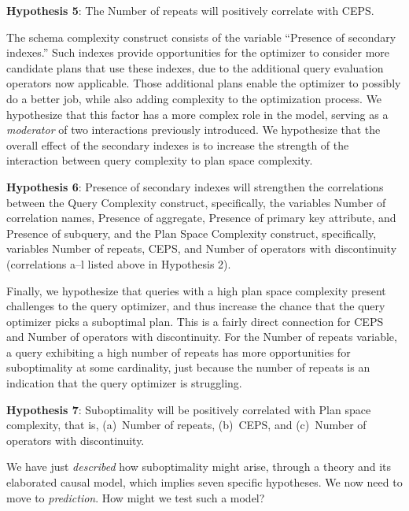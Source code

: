 \documentclass[prodmode,acmtods]{acmsmall}
\begin{document}
\vspace{0.6em}\noindent
{\bf Hypothesis 5}: The Number of repeats will positively correlate with CEPS. 

\vspace{0.6em}
The schema complexity construct consists of the variable ``Presence of
secondary indexes.'' Such indexes provide opportunities for the optimizer to
consider more candidate plans that use these indexes, due to the additional
query evaluation operators now applicable. Those additional plans enable the optimizer to
possibly do a better job, while also adding complexity to the optimization
process. We hypothesize that this factor has a more complex role in the
model, serving as a {\em moderator} of two interactions previously
introduced. We hypothesize that the overall effect of the secondary indexes
is to increase the strength of the interaction between query
complexity to plan space complexity.

\vspace{0.6em}\noindent
{\bf Hypothesis 6}: Presence of secondary indexes will strengthen
the correlations between the Query Complexity construct, specifically, the
variables Number of
correlation names, Presence of aggregate, Presence of primary key
attribute, and Presence of subquery, and
the Plan Space Complexity construct, specifically, variables Number of repeats, CEPS, and Number
of operators with discontinuity (correlations a--l listed above in
Hypothesis 2).

\vspace{0.6em}
Finally, we hypothesize that queries with a high plan space complexity
present challenges to the query optimizer, and thus increase the chance that
the query optimizer picks a suboptimal plan. This is a fairly direct
connection for CEPS and Number of operators with discontinuity. For the
Number of repeats variable, a query exhibiting a high number of repeats has
more opportunities for suboptimality at some cardinality, just because the
number of repeats is an indication that the query optimizer is struggling.

\vspace{0.6em}\noindent
{\bf Hypothesis 7}: Suboptimality will be positively correlated with Plan
space complexity, that is, (a)~Number of repeats, (b)~CEPS, and (c)~Number
of operators with discontinuity.

\vspace{0.6em}
We have just {\em described} how
suboptimality might arise, through a theory and its elaborated causal model,
which implies seven specific hypotheses.
We now need to move to {\em prediction}.
How might we test such a model? 
\end{document}
